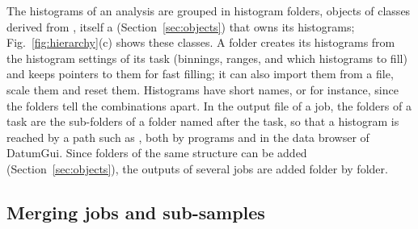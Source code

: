 The histograms of an analysis are grouped in histogram folders, objects of classes derived from
, itself a  (Section~\ref{sec:objects}) that owns its histograms;
Fig.~\ref{fig:hierarchy}(c) shows these classes. A folder creates its histograms from the histogram settings of its
task (binnings, ranges, and which histograms to fill) and keeps pointers to them for fast filling; it can also import
them from a file, scale them and reset them. Histograms have short names,  or  for
instance, since the folders tell the combinations apart. In the output file of a job, the folders of a task are the
sub-folders of a folder named after the task, so that a histogram is reached by a path such as
, both by programs and in the data browser of DatumGui. Since folders of the same structure can be added
(Section~\ref{sec:objects}), the outputs of several jobs are added folder by folder.

\subsection{Merging jobs and sub-samples}
\label{sec:subsample}

